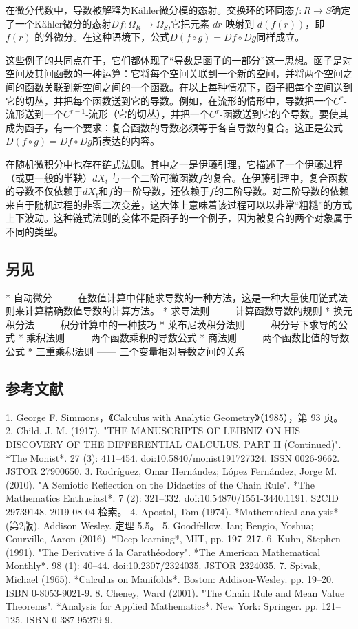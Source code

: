在微分代数中，导数被解释为Kähler微分模的态射。交换环的环同态$f : R \to S$确定了一个Kähler微分的态射$Df : \Omega_R \to \Omega_S$,它把元素 $dr$ 映射到 $d(f(r))$，即 $f(r)$ 的外微分。在这种语境下，公式$D(f \circ g) = Df \circ Dg
$同样成立。

这些例子的共同点在于，它们都体现了“导数是函子的一部分”这一思想。函子是对空间及其间函数的一种运算：它将每个空间关联到一个新的空间，并将两个空间之间的函数关联到新空间之间的一个函数。在以上每种情况下，函子把每个空间送到它的切丛，并把每个函数送到它的导数。例如，在流形的情形中，导数把一个$C^r$-流形送到一个$C^{r-1}$-流形（它的切丛），并把一个$C^r$-函数送到它的全导数。要使其成为函子，有一个要求：复合函数的导数必须等于各自导数的复合。这正是公式$D(f \circ g) = Df \circ Dg$所表达的内容。

在随机微积分中也存在链式法则。其中之一是伊藤引理，它描述了一个伊藤过程（或更一般的半鞅）$dX_t$ 与一个二阶可微函数$f$的复合。在伊藤引理中，复合函数的导数不仅依赖于$dX_t$和$f$的一阶导数，还依赖于$f$的二阶导数。对二阶导数的依赖来自于随机过程的非零二次变差，这大体上意味着该过程可以以非常“粗糙”的方式上下波动。这种链式法则的变体不是函子的一个例子，因为被复合的两个对象属于不同的类型。
\subsection{另见}
* 自动微分 —— 在数值计算中伴随求导数的一种方法，这是一种大量使用链式法则来计算精确数值导数的计算方法。
* 求导法则 —— 计算函数导数的规则
* 换元积分法 —— 积分计算中的一种技巧
* 莱布尼茨积分法则 —— 积分号下求导的公式
* 乘积法则 —— 两个函数乘积的导数公式
* 商法则 —— 两个函数比值的导数公式
* 三重乘积法则 —— 三个变量相对导数之间的关系
\subsection{参考文献}
1. George F. Simmons，《Calculus with Analytic Geometry》（1985），第 93 页。
2. Child, J. M. (1917). "THE MANUSCRIPTS OF LEIBNIZ ON HIS DISCOVERY OF THE DIFFERENTIAL CALCULUS. PART II (Continued)". *The Monist*. 27 (3): 411–454. doi:10.5840/monist191727324. ISSN 0026-9662. JSTOR 27900650.
3. Rodríguez, Omar Hernández; López Fernández, Jorge M. (2010). "A Semiotic Reflection on the Didactics of the Chain Rule". *The Mathematics Enthusiast*. 7 (2): 321–332. doi:10.54870/1551-3440.1191. S2CID 29739148. 2019-08-04 检索。
4. Apostol, Tom (1974). *Mathematical analysis* (第2版). Addison Wesley. 定理 5.5。
5. Goodfellow, Ian; Bengio, Yoshua; Courville, Aaron (2016). *Deep learning*, MIT, pp. 197–217.
6. Kuhn, Stephen (1991). "The Derivative á la Carathéodory". *The American Mathematical Monthly*. 98 (1): 40–44. doi:10.2307/2324035. JSTOR 2324035.
7. Spivak, Michael (1965). *Calculus on Manifolds*. Boston: Addison-Wesley. pp. 19–20. ISBN 0-8053-9021-9.
8. Cheney, Ward (2001). "The Chain Rule and Mean Value Theorems". *Analysis for Applied Mathematics*. New York: Springer. pp. 121–125. ISBN 0-387-95279-9.


